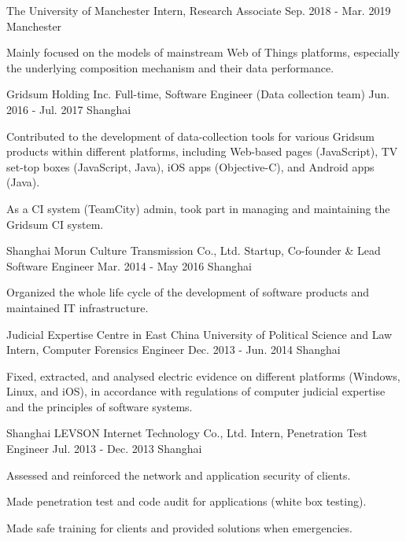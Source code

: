 \begin{cventries}
	  \cventry
	{The University of Manchester}
	{Intern, Research Associate}
	{Sep. 2018 - Mar. 2019}
	{Manchester}
	{
		\begin{cvitems}
			\item {Mainly focused on the models of mainstream Web of Things platforms, especially the underlying composition mechanism and their data performance.}
		\end{cvitems}
	}

  \cventry
    {Gridsum Holding Inc.}
    {Full-time, Software Engineer (Data collection team)}
    {Jun. 2016 - Jul. 2017}
    {Shanghai}
    {
      \begin{cvitems}
        \item {Contributed to the development of data-collection tools for various Gridsum products within different platforms, including Web-based pages (JavaScript), TV set-top boxes (JavaScript, Java), iOS apps (Objective-C), and Android apps (Java).}
        \item {As a CI system (TeamCity) admin, took part in managing and maintaining the Gridsum CI system.}
      \end{cvitems}
    }
    
  \cventry
    {Shanghai Morun Culture Transmission Co., Ltd.}
    {Startup, Co-founder \& Lead Software Engineer}
    {Mar. 2014 - May 2016}
    {Shanghai}
    {
      \begin{cvitems}
        \item {Organized the whole life cycle of the development of software products and maintained IT infrastructure.}
      \end{cvitems}
    }
    
  \cventry
    {Judicial Expertise Centre in East China University of Political Science and Law}
    {Intern, Computer Forensics Engineer}
    {Dec. 2013 - Jun. 2014}
    {Shanghai}
    {
      \begin{cvitems}
        \item {Fixed, extracted, and analysed electric evidence on different platforms (Windows, Linux, and iOS), in accordance with regulations of computer judicial expertise and the principles of software systems.}
      \end{cvitems} 
    }
    
  \cventry
    {Shanghai LEVSON Internet Technology Co., Ltd.}
    {Intern, Penetration Test Engineer}
    {Jul. 2013 - Dec. 2013}
    {Shanghai}
    {
      \begin{cvitems}
        \item {Assessed and reinforced the network and application security of clients.}
        \item {Made penetration test and code audit for applications (white box testing).}
        \item {Made safe training for clients and provided solutions when emergencies.}
      \end{cvitems}
    }

\end{cventries}
